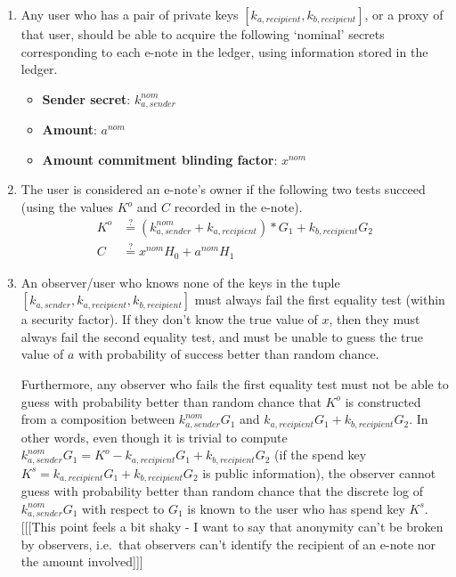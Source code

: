 \begin{enumerate}
    \item Any user who has a pair of private keys $[k_{a,recipient}, k_{b,recipient}]$, or a proxy of that user, should be able to acquire the following `nominal' secrets corresponding to each e-note in the ledger, using information stored in the ledger.

    \begin{itemize}
        \item \textbf{Sender secret}: $k^{nom}_{a,sender}$
        \item \textbf{Amount}: $a^{nom}$
        \item \textbf{Amount commitment blinding factor}: $x^{nom}$
    \end{itemize}

    \item The user is considered an e-note's owner if the following two tests succeed (using the values $K^o$ and $C$ recorded in the e-note).\vspace{.115cm}
    \begin{align*}
        K^o &\stackrel{?}{=} (k^{nom}_{a,sender} + k_{a,recipient})*G_1 + k_{b,recipient} G_2 \\
        C &\stackrel{?}{=} x^{nom} H_0 + a^{nom} H_1
    \end{align*}

    \item An observer/user who knows none of the keys in the tuple $[k_{a,sender}, k_{a,recipient}, k_{b,recipient}]$ must always fail the first equality test (within a security factor). If they don't know the true value of $x$, then they must always fail the second equality test, and must be unable to guess the true value of $a$ with probability of success better than random chance.

    Furthermore, any observer who fails the first equality test must not be able to guess with probability better than random chance that $K^o$ is constructed from a composition between $k^{nom}_{a,sender} G_1$ and $k_{a,recipient} G_1 + k_{b,recipient} G_2$. In other words, even though it is trivial to compute $k^{nom}_{a,sender} G_1 = K^o - k_{a,recipient} G_1 + k_{b,recipient} G_2$ (if the spend key $K^s = k_{a,recipient} G_1 + k_{b,recipient} G_2$ is public information), the observer cannot guess with probability better than random chance that the discrete log of $k^{nom}_{a,sender} G_1$ with respect to $G_1$ is known to the user who has spend key $K^s$. [[[This point feels a bit shaky - I want to say that anonymity can't be broken by observers, i.e.\ that observers can't identify the recipient of an e-note nor the amount involved]]]
\end{enumerate}

